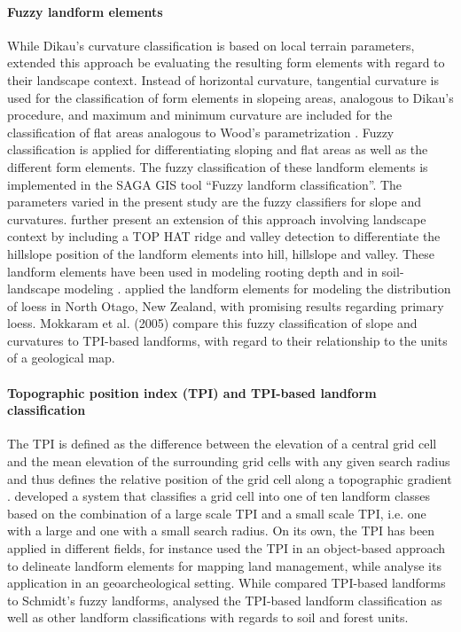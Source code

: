 \documentclass[preprint,12pt,authoryear]{elsarticle}
\begin{document}
\paragraph{Fuzzy landform elements \citep{Schmidt2004}}
While Dikau's curvature classification is based on local terrain parameters, \cite{Schmidt2004} extended this approach be evaluating the resulting form elements with regard to their landscape context.  Instead of horizontal curvature, tangential curvature is used for the classification of form elements in slopeing areas, analogous to Dikau's procedure, and maximum and minimum curvature are included for the classification of flat areas analogous to Wood's parametrization \citep{Wood1996}. Fuzzy classification is applied for differentiating sloping and flat areas as well as the different form elements. The fuzzy classification of these landform elements is implemented in the SAGA GIS tool “Fuzzy landform classification”. The parameters varied in the present study are the fuzzy classifiers for slope and curvatures. \cite{Schmidt2004} further present an extension of this approach involving landscape context by including a TOP HAT ridge and valley detection \citep{Rodriguez2002}  to differentiate the hillslope position of the landform elements into hill, hillslope and valley. These landform elements have been used in modeling rooting depth \citep{Schmidt2004} and in  soil-landscape modeling \citep{Schmidt2005}. \cite{Hughes2009} applied  the landform elements for modeling the distribution of loess in North Otago, New Zealand, with promising results regarding primary loess. Mokkaram et al. (2005) compare this fuzzy classification of slope and curvatures to TPI-based landforms, with regard to their relationship to the units of a geological map.
\paragraph{Topographic position index (TPI) and TPI-based landform classification \citep{Weiss2000}}
The TPI is defined as the difference between the elevation of a central grid cell and the mean elevation of the surrounding grid cells with any given search radius and thus defines the relative position of the grid cell along a topographic gradient \citep{Guisan1999}. \cite{Weiss2000} developed a system that classifies a grid cell into one of ten landform classes based on the combination of a large scale TPI and a small scale TPI, i.e. one with a large and one with a small search radius.  On its own, the TPI has been applied in different fields, for instance \cite{Gercek2010} used the TPI in an object-based approach to delineate landform elements for mapping land management, while \cite{Reu2013} analyse its application in an geoarcheological setting. While \cite{Mokarram2015} compared TPI-based landforms to Schmidt's fuzzy landforms, \cite{Barka2011} analysed the TPI-based landform classification as well as other landform classifications with regards to  soil and forest units.
\end{document}
